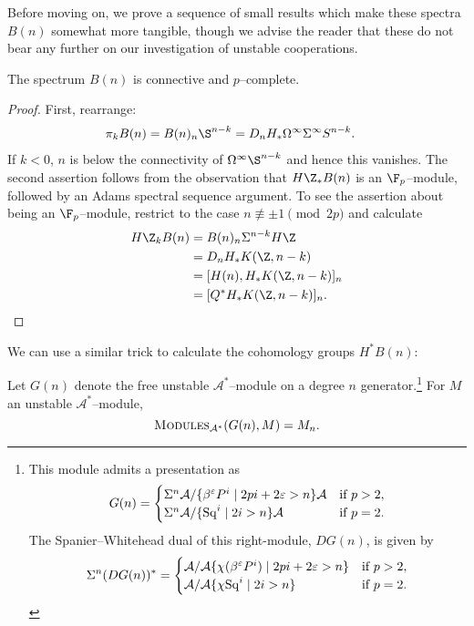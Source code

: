 Before moving on, we prove a sequence of small results which make these spectra \(B(n)\) somewhat more tangible, though we advise the reader that these do not bear any further on our investigation of unstable cooperations.

\begin{lemma}
The spectrum \(B(n)\) is connective and \(p\)--complete.
\end{lemma}
\begin{proof}
First, rearrange:
\begin{align*}
\pi_k B(n) & = B(n)_n \S^{n-k} = D_n H_* \Loops^\infty \Susp^\infty S^{n-k}.
\end{align*}
If \(k < 0\), \(n\) is below the connectivity of \(\Loops^\infty \S^{n-k}\) and hence this vanishes.  The second assertion follows from the observation that \(H\Z_* B(n)\) is an \(\F_p\)--module, followed by an Adams spectral sequence argument.  To see the assertion about being an \(\F_p\)--module, restrict to the case \(n \not\equiv \pm 1 \pmod{2p}\) and calculate
\begin{align*}
H\Z_k B(n) & = B(n)_n \Susp^{n-k} H\Z \\
& = D_n H_* K(\Z, n-k) \\
& = [H(n), H_* K(\Z, n-k)]_n \\
& = [Q^* H_* K(\Z, n-k)]_n. \qedhere
\end{align*}
\end{proof}

We can use a similar trick to calculate the cohomology groups \(H^* B(n)\):

\begin{definition}\label{SpanierWhiteheadDualOfGeneratingModule}
Let \(G(n)\) denote the free unstable \(\mathcal A^*\)--module on a degree \(n\) generator.\footnote{This module admits a presentation as \[G(n) = \begin{cases} \Sigma^n \mathcal A / \{\beta^\varepsilon P^i \mid 2pi + 2\varepsilon > n\}\mathcal A & \text{if \(p > 2\)}, \\ \Sigma^n \mathcal A / \{\operatorname{Sq}^i \mid 2i > n\}\mathcal A & \text{if \(p = 2\)}. \end{cases}\]  The Spanier--Whitehead dual of this right-module, \(DG(n)\), is given by \[\Sigma^n (D G(n))^* = \begin{cases}\mathcal A / \mathcal A \{\chi(\beta^\varepsilon P^i) \mid 2pi + 2\varepsilon > n\} & \text{if \(p > 2\)}, \\ \mathcal A / \mathcal A \{\chi{\operatorname{Sq}^i} \mid 2i > n\} & \text{if \(p = 2\)}. \end{cases}\]}  For \(M\) an unstable \(\mathcal A^*\)--module, \[\normalfont\textsc{Modules}_{\mathcal A^*}(G(n), M) = M_n.\]
\end{definition}

